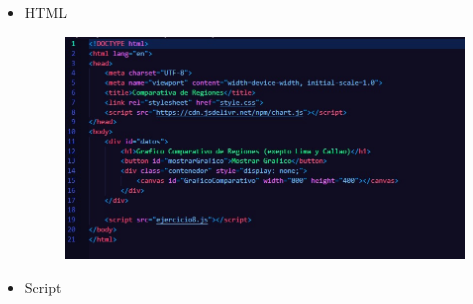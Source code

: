 \documentclass{article}
\begin{document}
	\begin{itemize}
		\item HTML
		\begin{figure}[H]
			\centering
			\includegraphics[width=1.0\textwidth,keepaspectratio]{img/Ejer8T2HTMl.jpg}
		\end{figure}
		\item Script
		\begin{figure}[H]
			\centering

\end{figure}
\end{itemize}
\end{document}
